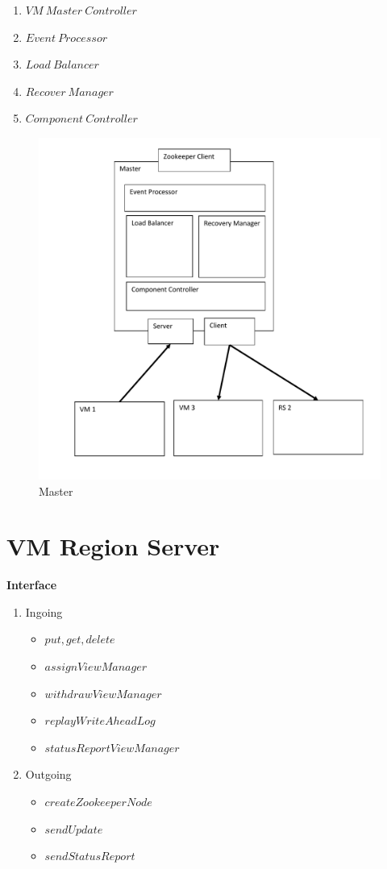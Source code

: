 \begin{enumerate}
	\item $VM\:Master\:Controller$
	\item $Event\:Processor$
	\item $Load\:Balancer$
	\item $Recover\:Manager$
	\item $Component\:Controller$
\end{enumerate}
\newpage
\begin{figure}[h!] 
  \centering
    \includegraphics[scale=0.8]{figures/Master}
    \caption{Master}
    \label{fig:master}
\end{figure}

\newpage

\section{VM Region Server}

\textbf{Interface}

\begin{enumerate}
	\item Ingoing
	\begin{itemize}
		\item $put, get, delete$
		\item $assignViewManager$
		\item $withdrawViewManager$
		\item $replayWriteAheadLog$
		\item $statusReportViewManager$
	\end{itemize}
	\item Outgoing
	\begin{itemize}
		\item $createZookeeperNode$
		\item $sendUpdate$
		\item $sendStatusReport$
	\end{itemize}
\end{enumerate}


